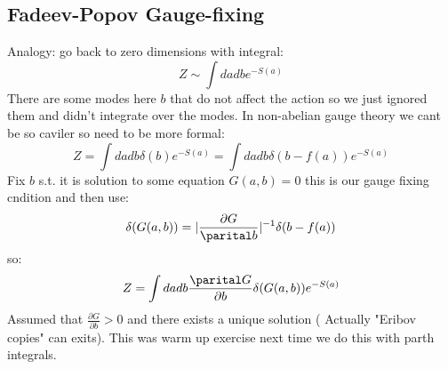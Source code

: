 \documentclass{article}
\begin{document}
       \subsection{Fadeev-Popov Gauge-fixing}
       Analogy: go back to zero dimensions with integral:
       $$
       Z \sim \int da db e^{-S(a)}
       $$
       There are some modes here $b$ that do not affect the action so we just ignored them and didn't integrate over the modes. In non-abelian gauge theory we cant be so caviler so need to be more formal:
       $$
       Z = \int da db \delta(b) e^{- S(a)} = \int da db \delta (b - f(a)) e^{- S(a)}
       $$
       Fix $b$ s.t. it is solution to some equation $G(a,b) = 0$ this is our gauge fixing cndition and then use:
       $$ 
       \delta( G(a,b)) = | \frac{\partial G}{\parital b}|^{-1} \delta (b - f(a))
       $$
       so:
       $$
        Z = \int da db \frac{\parital G}{\partial b} \delta( G(a,b)) e^{- S(a)}
       $$
       Assumed that $\frac{\partial G}{\partial b} > 0$  and there exists a unique solution ( Actually "Eribov copies" can exits). This was warm up exercise next time we do this with parth integrals.
\end{document}
